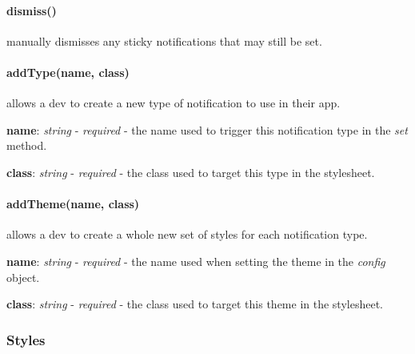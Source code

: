 \paragraph*{dismiss()}

manually dismisses any sticky notifications that may still be set.

\paragraph*{add\+Type(name, class)}

allows a dev to create a new type of notification to use in their app.
\begin{DoxyItemize}
\item {\bfseries name}\+: {\itshape string} -\/ {\itshape required} -\/ the name used to trigger this notification type in the {\itshape set} method.
\item {\bfseries class}\+: {\itshape string} -\/ {\itshape required} -\/ the class used to target this type in the stylesheet.
\end{DoxyItemize}

\paragraph*{add\+Theme(name, class)}

allows a dev to create a whole new set of styles for each notification type.
\begin{DoxyItemize}
\item {\bfseries name}\+: {\itshape string} -\/ {\itshape required} -\/ the name used when setting the theme in the {\itshape config} object.
\item {\bfseries class}\+: {\itshape string} -\/ {\itshape required} -\/ the class used to target this theme in the stylesheet.
\end{DoxyItemize}

\subsubsection*{Styles}


